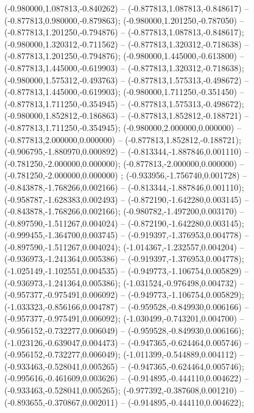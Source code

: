  (-0.980000,1.087813,-0.840262) -- (-0.877813,1.087813,-0.848617) -- (-0.877813,0.980000,-0.879863);
 (-0.980000,1.201250,-0.787050) -- (-0.877813,1.201250,-0.794876) -- (-0.877813,1.087813,-0.848617);
 (-0.980000,1.320312,-0.711562) -- (-0.877813,1.320312,-0.718638) -- (-0.877813,1.201250,-0.794876);
 (-0.980000,1.445000,-0.613800) -- (-0.877813,1.445000,-0.619903) -- (-0.877813,1.320312,-0.718638);
 (-0.980000,1.575312,-0.493763) -- (-0.877813,1.575313,-0.498672) -- (-0.877813,1.445000,-0.619903);
 (-0.980000,1.711250,-0.351450) -- (-0.877813,1.711250,-0.354945) -- (-0.877813,1.575313,-0.498672);
 (-0.980000,1.852812,-0.186863) -- (-0.877813,1.852812,-0.188721) -- (-0.877813,1.711250,-0.354945);
 (-0.980000,2.000000,0.000000) -- (-0.877813,2.000000,0.000000) -- (-0.877813,1.852812,-0.188721);
 (-0.906795,-1.880970,0.000892) -- (-0.813344,-1.887846,0.001110) -- (-0.781250,-2.000000,0.000000);
 (-0.877813,-2.000000,0.000000) -- (-0.781250,-2.000000,0.000000) ;
 (-0.933956,-1.756740,0.001728) -- (-0.843878,-1.768266,0.002166) -- (-0.813344,-1.887846,0.001110);
 (-0.958787,-1.628383,0.002493) -- (-0.872190,-1.642280,0.003145) -- (-0.843878,-1.768266,0.002166);
 (-0.980782,-1.497200,0.003170) -- (-0.897590,-1.511267,0.004024) -- (-0.872190,-1.642280,0.003145);
 (-0.999455,-1.364700,0.003745) -- (-0.919397,-1.376953,0.004778) -- (-0.897590,-1.511267,0.004024);
 (-1.014367,-1.232557,0.004204) -- (-0.936973,-1.241364,0.005386) -- (-0.919397,-1.376953,0.004778);
 (-1.025149,-1.102551,0.004535) -- (-0.949773,-1.106754,0.005829) -- (-0.936973,-1.241364,0.005386);
 (-1.031524,-0.976498,0.004732) -- (-0.957377,-0.975491,0.006092) -- (-0.949773,-1.106754,0.005829);
 (-1.033323,-0.856166,0.004787) -- (-0.959528,-0.849930,0.006166) -- (-0.957377,-0.975491,0.006092);
 (-1.030499,-0.743201,0.004700) -- (-0.956152,-0.732277,0.006049) -- (-0.959528,-0.849930,0.006166);
 (-1.023126,-0.639047,0.004473) -- (-0.947365,-0.624464,0.005746) -- (-0.956152,-0.732277,0.006049);
 (-1.011399,-0.544889,0.004112) -- (-0.933463,-0.528041,0.005265) -- (-0.947365,-0.624464,0.005746);
 (-0.995616,-0.461609,0.003626) -- (-0.914895,-0.444110,0.004622) -- (-0.933463,-0.528041,0.005265);
 (-0.977392,-0.387608,0.001210) -- (-0.893655,-0.370867,0.002011) -- (-0.914895,-0.444110,0.004622);
